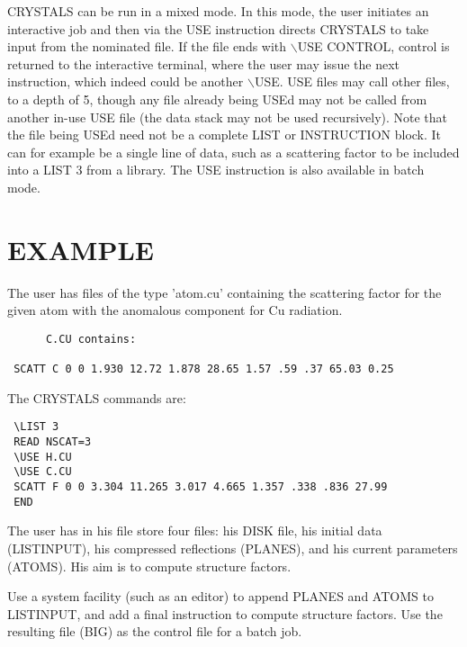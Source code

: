 \documentclass[10pt,a4paper]{report}
\begin{document}
\bigskip{}



 

CRYSTALS can be run in a mixed mode. In this mode, the user initiates an interactive job and then via the USE instruction directs CRYSTALS to take input from the nominated file. If the file ends with $\backslash$USE CONTROL, control is returned to the interactive terminal, where the user may issue the next instruction, which indeed could be another $\backslash$USE.  USE files may call other files, to a depth of 5, though any file already being USEd may not be called from another in-use USE file (the data stack may not be used recursively). Note that the file being USEd need not be a complete LIST or INSTRUCTION block. It can for example be a single line of data, such as a scattering factor to be included into a LIST 3 from a library. The USE instruction is also available in batch mode.\section{EXAMPLE}


The user has files of the type 'atom.cu' containing the scattering factor
 for the given atom with the anomalous component for Cu radiation.

\small\begin{verbatim}
      C.CU contains:
      
 SCATT C 0 0 1.930 12.72 1.878 28.65 1.57 .59 .37 65.03 0.25
\end{verbatim}\normalsize

 


  The CRYSTALS commands are:



\small\begin{verbatim} 
 \LIST 3
 READ NSCAT=3
 \USE H.CU
 \USE C.CU
 SCATT F 0 0 3.304 11.265 3.017 4.665 1.357 .338 .836 27.99
 END
\end{verbatim}\normalsize




The user has in his file store four files: his DISK file, his initial
 data (LISTINPUT), his compressed reflections (PLANES), and his current
 parameters (ATOMS). His aim is to compute structure factors.


\bigskip{}




 Use a system facility (such as an editor) to append PLANES and
 ATOMS to LISTINPUT, and add a final instruction to compute structure factors.
 Use the resulting file (BIG) as the control file for a batch job.
\end{document}
